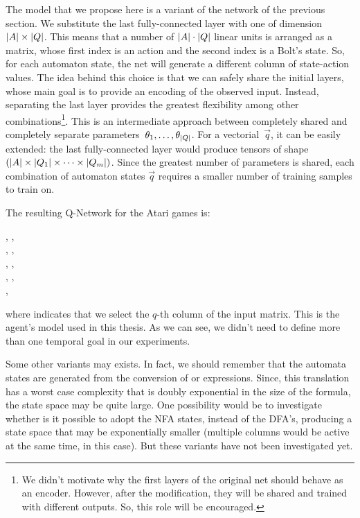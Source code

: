 The model that we propose here is a variant of the network of the previous
section. We substitute the last fully-connected layer with one of dimension
$\lvert A\rvert \times \lvert Q\rvert$. This means that a number of $\lvert A\rvert \cdot \lvert Q\rvert$
linear units is arranged as a matrix, whose first index is an action and
the second index is a Bolt's state. So, for each automaton state, the net will
generate a different column of state-action values. The idea behind this
choice is that we can safely share the initial layers, whose main goal is to
provide an encoding of the observed input. Instead, separating the last layer
provides the greatest flexibility among other combinations\footnote{
	We didn't motivate why the first layers of the original net should behave as
	an encoder. However, after the modification, they will be shared and trained
	with different outputs. So, this role will be encouraged.
}. This is an intermediate approach between completely shared and completely
separate parameters~$\theta_1, \dots, \theta_{\lvert Q\rvert}$. For a
vectorial~$\vec{q}$, it can be easily extended: the last fully-connected layer
would produce tensors of shape $(\lvert A\rvert \times \lvert Q_1\rvert \times \dots \times
\lvert Q_m\rvert)$. Since the greatest number of parameters is shared, each
combination of automaton states $\vec{q}$ requires a smaller number of
training samples to train on.

The resulting Q-Network for the Atari games is:
\begin{center}
	, \relu{}, \\
	, \relu{}, \\
	, \relu{}, \\
	, \relu{}, \\
	, \\
\end{center}
where  indicates that we select the $q$-th column of
the input matrix. This is the agent's model used in this thesis. As we can
see, we didn't need to define more than one temporal goal in our experiments.

Some other variants may exists. In fact, we should remember that the automata
states are generated from the conversion of  \ldl{} or \ltl{} expressions.
Since, this translation has a worst case complexity that is doubly exponential
in the size of the formula, the state space may be quite large. One
possibility would be to investigate whether is it possible to adopt the NFA
states, instead of the DFA's, producing a state space that may be
exponentially smaller (multiple columns would be active at the same time, in
this case). But these variants have not been investigated yet.

